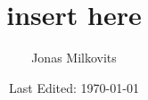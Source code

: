 


\begin{titlepage}
  \title{insert here} %
  \author{Jonas Milkovits}
  \date{Last Edited: \today}
\end{titlepage}




\maketitle
{} %
\tableofcontents
\clearpage
{} %


\clearpage


